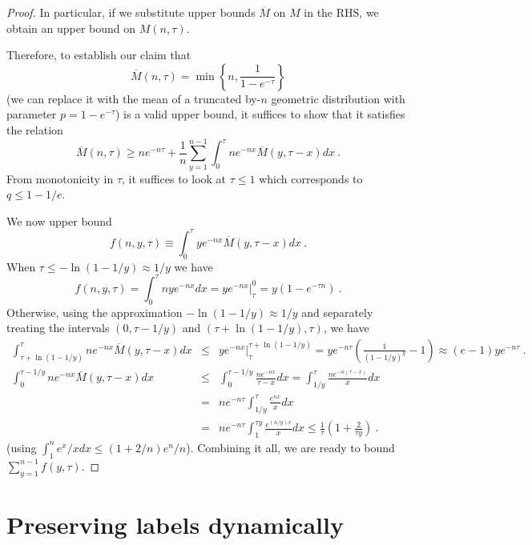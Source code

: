 \documentclass[11pt]{article}
\theoremstyle{plain}
\theoremstyle{definition}
\theoremstyle{remark}
\numberwithin{equation}{section}
\begin{document}
{\begin{proof}
In particular, if we substitute upper bounds $\overline{M}$ on $M$ in the RHS, we obtain an
upper bound on $M(n,\tau)$.

 Therefore, to establish our claim that 
\begin{equation} \label{uppereq} \overline{M}(n,\tau) = \min\left\{n,
    \frac{1}{1-e^{-\tau}}\right\} \end{equation}
(we can replace it with the mean of a truncated by-$n$ geometric distribution
with parameter $p=1-e^{-\tau}$)
is a valid upper bound, it suffices to show that it satisfies the relation
$$\overline{M}(n,\tau) \geq  n e^{-n\tau} + \frac{1}{n}\sum_{y=1}^{n-1}\int_0^\tau n e^{-nx} \overline{M}(y,\tau-x) dx\ .$$
From monotonicity in $\tau$, it suffices to look at $\tau \leq 1$
which corresponds to $q \leq 1-1/e$.

  We now upper bound
\begin{equation}
f(n,y,\tau) \equiv \int_0^\tau y e^{-n x} \overline{M}(y,\tau-x) dx\
.\end{equation}
  When
$\tau \leq -\ln(1-1/y) \approx 1/y$ we have  
\begin{equation}
f(n,y,\tau)= \int_0^\tau
n ye^{-nx} dx = y e^{-nx} \vert^0_\tau = y(1-e^{-\tau n}) \ .
\end{equation}
   Otherwise, using the approximation
$-\ln(1-1/y) \approx 1/y$ and separately treating  the
intervals $(0,\tau -1/y)$
and $(\tau+\ln(1-1/y),\tau)$, we have 
\begin{eqnarray*}
\int_{\tau+\ln(1-1/y)}^\tau n e^{-nx} \overline{M}(y,\tau-x) dx &\leq& 
 y e^{-nx} \vert^{\tau+\ln(1-1/y)}_\tau = y e^{-n\tau}(\frac{1}{(1-1/y)^y}
 -1) \approx (e-1) y e^{-n\tau}\ . \\
\int_0^{\tau-1/y} n e^{-nx} \overline{M}(y,\tau-x) dx &\leq&
\int_0^{\tau-1/y} \frac{n e^{-nx}}{\tau-x}  dx  = 
\int_{1/y}^{\tau} \frac{n e^{-n(\tau-x)}}{x}  dx  \\
&=&  n e^{-n\tau} \int_{1/y}^{\tau} \frac{e^{nx}}{x} dx \\
&=&  n e^{-n\tau} \int_1^{\tau y} \frac{e^{(n/y) x}}{x} dx \leq
\frac{1}{\tau} (1+\frac{2}{\tau y})\ .
\end{eqnarray*}
(using $\int_{1}^n e^x/x dx \leq (1+2/n) e^n/n$).
Combining it all, we are ready to bound $\sum_{y=1}^{n-1} f(y,\tau)$.

 \end{proof}
}


\section{Preserving labels dynamically} \label{sec:2directions}
\end{document}
